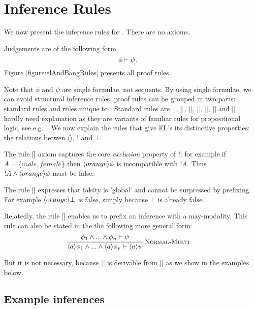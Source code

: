\section{Inference Rules}\label{elAndBangMore}



\NI We now present the inference rules for \ELFULL{}. There are no
axioms.

\begin{definition} Judgements are of the following form.
\[
  \phi \vdash \psi.
\]
Figure \ref{figure:elAndBangRules} presents all proof rules. 
\end{definition}

\NI Note that $\phi$ and $\psi$ are single formulae, not sequents.  By
using single formulae, we can avoid structural inference rules.  \ELABR{}
proof rules can be grouped in two parts: standard rules and rules
unique to \ELABR{}.  Standard rules are [],
[], [],
[], [],
[] and [] hardly need
explanation as they are variants of familiar rules for propositional
logic, see e.g.~\cite{TroelstraAS:basprot,vanDalenD:logstr}.  We now
explain the rules that give EL's its distinctive properties: the
relations betwen $\langle \rangle$, $!$ and $\bot$.

The rule [] axiom captures the core
\emph{exclusion} property of !: for example if $A = \{male, female\}$
then $\langle orange \rangle \phi$ is incompatible with $!A$. Thus $!A \land
\langle orange \rangle \phi$ must be false.

The rule [] expresses that falsity is 'global'
  and cannot be surpressed by prefixing. For example
  $\langle orange \rangle \bot$ is false, simply because $\bot$ is already
  false.

Relatedly, the rule [] enables us to
prefix an inference with a may-modality. 
This rule can also be stated in the the following more general
form:
\[
   \frac{\displaystyle{ 
     \phi_1\land...\land\phi_n \vdash\psi
    }}{\displaystyle{ 
     \langle a \rangle \phi_1\land...\land\langle a \rangle \phi_n \vdash\langle a \rangle \psi
    }}\,\textsc{\small Normal-Multi}
\]

\NI But it is not necessary, because [] is
derivable from [] as we show in the examples below.

\subsection{Example inferences}

